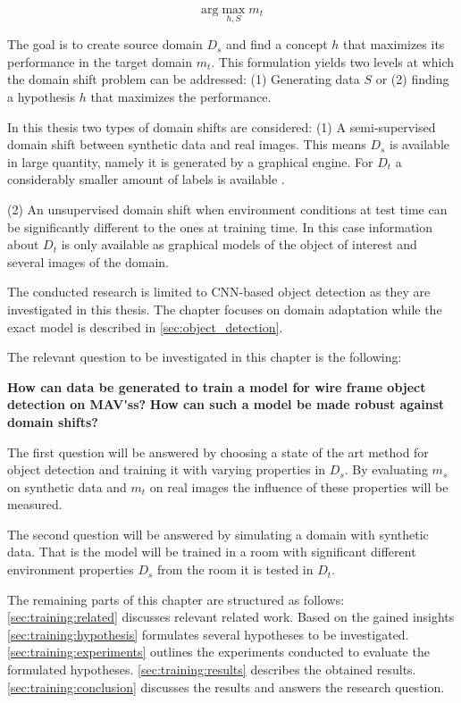 $$
\text{arg}\max\limits_{h,S} m_t
$$

The goal is to create source domain $D_s$ and find a concept $h$ that maximizes its performance in the target domain $m_t$. This formulation yields two levels at which the domain shift problem can be addressed: (1) Generating data $S$ or (2) finding a hypothesis $h$ that maximizes the performance.

In this thesis two types of domain shifts are considered: (1) A semi-supervised domain shift between synthetic data and real images. This means $D_s$ is available in large quantity, namely it is generated by a graphical engine. For $D_t$ a considerably smaller amount of labels is available . 

(2) An unsupervised domain shift when environment conditions at test time can be significantly different to the ones at training time. In this case information about $D_t$ is only available as graphical models of the object of interest and several images of the domain. 

The conducted research is limited to \ac{CNN}-based object detection as they are investigated in this thesis. The chapter focuses on domain adaptation while the exact model is described in \autoref{sec:object_detection}.

The relevant question to be investigated in this chapter is the following:

\begin{center}
	\textbf{How can data be generated to train a model for wire frame object detection on \acp{MAV's}?}
	\textbf{How can such a model be made robust against domain shifts?}
\end{center}

The first question will be answered by choosing a state of the art method for object detection and training it with varying properties in $D_s$. By evaluating $m_s$ on synthetic data and $m_t$ on real images the influence of these properties will be measured.  

The second question will be answered by simulating a domain with synthetic data. That is the model will be trained in a room with significant different environment properties $D_s$ from the room it is tested in $D_t$.

The remaining parts of this chapter are structured as follows: \autoref{sec:training:related} discusses relevant related work. Based on the gained insights \autoref{sec:training:hypothesis} formulates several hypotheses to be investigated. \autoref{sec:training:experiments} outlines the experiments conducted to evaluate the formulated hypotheses. \autoref{sec:training:results} describes the obtained results. \autoref{sec:training:conclusion} discusses the results and answers the research question.

